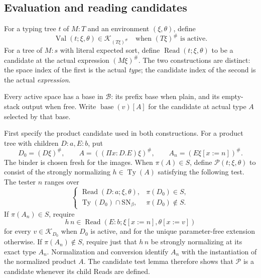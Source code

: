 \subsection{Evaluation and reading candidates}
\label{obs:evaluation}

For a typing tree $t$ of $M:T$ and an environment $(\xi,\theta)$, define
\[
 \operatorname{Val}(t;\xi,\theta)\in\mathcal K_{(T\xi)^\#}
 \quad\text{when $(T\xi)^\#$ is active.}
\]
For a tree of $M:s$ with literal expected sort, define
$\operatorname{Read}(t;\xi,\theta)$ to be a candidate at the actual
expression $(M\xi)^\#$.  The two constructions are distinct: the
space index of the first is the actual \emph{type}; the candidate index
of the second is the actual \emph{expression}.

Every active space has a base in $\mathcal B$: its prefix base when
plain, and its empty-stack output when free.  Write
$\operatorname{base}(v)[A]$ for the candidate at actual type $A$ selected
by that base.

First specify the product candidate used in both constructions.
For a product tree with children $D:a,E:b$, put
\[
 D_0=(D\xi)^\#,
 \qquad A=((\Pi x:D.E)\xi)^\#,
 \qquad A_n=(E\xi[x:=n])^\#.
\]
The binder is chosen fresh for the images.
When $\pi(A)\in S$, define $\mathcal P(t;\xi,\theta)$ to consist of
the strongly normalizing $h\in\operatorname{Ty}(A)$ satisfying the
following test.  The tester $n$ ranges over
\[
 \begin{cases}
 \operatorname{Read}(D:a;\xi,\theta),&\pi(D_0)\in S,\\
 \operatorname{Ty}(D_0)\cap\mathrm{SN}_\beta,&\pi(D_0)\notin S.
 \end{cases}
\]
If $\pi(A_n)\in S$, require
\begin{equation}\label{obs:product-test}
 h\,n\in\operatorname{Read}(E:b;\xi[x:=n],\theta[x:=v])
\end{equation}
for every $v\in\mathcal K_{D_0}$ when $D_0$ is active, and for the
unique parameter-free extension otherwise.  If $\pi(A_n)\notin S$,
require just that $h\,n$ be strongly normalizing at its exact type
$A_n$.  Normalization and conversion identify $A_n$ with the
instantiation of the normalized product $A$.  The candidate test lemma
therefore shows that $\mathcal P$ is a candidate whenever its child
Reads are defined.

